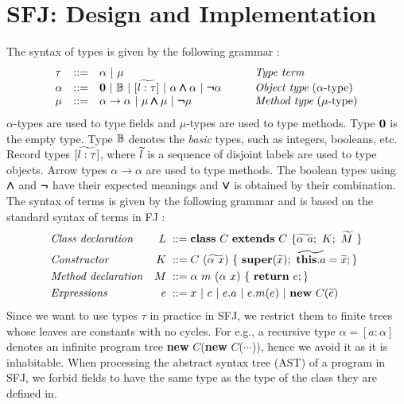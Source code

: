 \documentclass[runningheads]{llncs}
\begin{document}
\section{SFJ: Design and Implementation}
\label{sec:design}
The syntax of types is given by the following grammar \cite{Dardha2013,Dardha2017}:
$$
\begin{array}{llll}
\tau & ::= & \alpha \ |\ \mu
& \mbox{{\em Type term}}
\\
\alpha & ::=  & \zero \ |\ \btypes \ |\ [\wt{l:\tau}] \ |\ \alpha \synwedge \alpha \ |\ \synneg\alpha
\qquad
& \mbox{{\em Object type} ($\alpha $-type)}
\\
\mu & ::=  & \alpha \to \alpha \ |\ \mu \synwedge \mu \ |\ \synneg\mu
& \mbox{{\em Method type} ($\mu $-type)}
\end{array}
$$
$\alpha$-types are used to type fields and $\mu$-types are used to type methods.
Type $\mathbf{0}$ is the empty type.
Type ${\mathbb B}$ denotes the \emph{basic} types, such as integers, booleans, etc.
{Record} types $[\widetilde{l:\tau}]$, where $\widetilde{l}$ is a sequence of disjoint labels are used to type objects.
Arrow types $\alpha \to \alpha$ are used to type methods.
The boolean types using $\pmb{\wedge}$ and $\pmb{\neg}$ have their expected meanings and $\pmb{\vee}$ is obtained by their combination.\\
The syntax of terms is given by the following grammar and is based on the standard syntax of terms in FJ \cite{featherweight,Dardha2013,Dardha2017}:
\begin{align*}
& \mbox{\textit{Class declaration}} & L \; ::= \; & \syndecl{C}{C}{\wt{\alpha \ a};\ K; \ \wt{M}\ }\\
& \mbox{\textit{Constructor}} & K \;::=\; & C\ (\wt{\alpha\ x})\ \{\ \synsuper(\wt{x});\ \wt{\synthis.a}=\wt{x}; \}\\
& \mbox{\textit{Method declaration}} & M \; ::= \; & \alpha \ m\ (\alpha \ x)\ \{\ \synret e; \} \\
& \mbox{\textit{Expressions}} & e \; ::=\; & x\ |\  c\ |\ e.a\ |\ e.m(e) \ | \ \synnew C(\wt{e})
\end{align*}
Since we want to use types $\tau$ in practice in SFJ, we restrict them to finite trees whose leaves are constants with no cycles.
For e.g., a recursive type $\alpha = [a : \alpha]$ denotes an infinite program tree \textbf{new} $C$(\textbf{new} $C$($\cdots{}$)), hence we avoid it as it is inhabitable.
When processing the abstract syntax tree (AST) of a program in SFJ, we forbid fields to have the same type as the type of the class they are defined in. 
\end{document}
